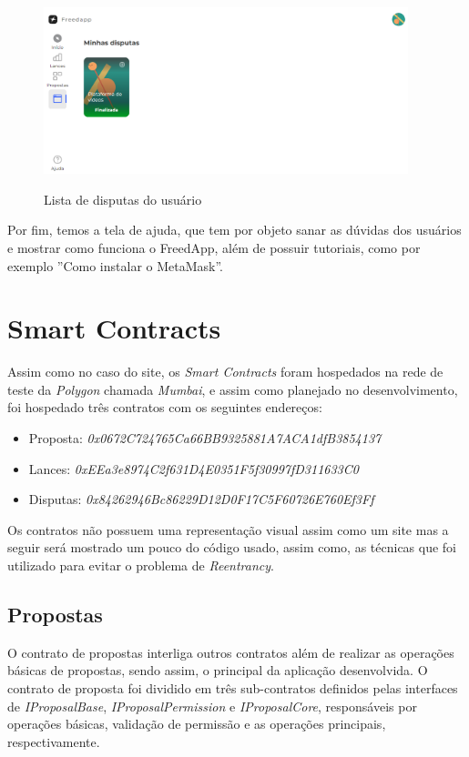 \begin{figure}[!h]
  \centering
  \caption{Lista de disputas do usuário}
  \includegraphics[width=400px]{src/images/app/dispute_finish.PNG}
  \label{fig:dispute_finish_fig}
\end{figure}

Por fim, temos a tela de ajuda, que tem por objeto sanar as dúvidas dos usuários e mostrar como funciona o FreedApp, além de possuir tutoriais, como por exemplo ''Como instalar o MetaMask''.

\section{Smart Contracts}

Assim como no caso do site, os \textit{Smart Contracts} foram hospedados na rede de teste da \textit{Polygon} chamada \textit{Mumbai}, e assim como planejado no desenvolvimento, foi hospedado três contratos com os seguintes endereços:

\begin{itemize}
    \item Proposta: \textit{0x0672C724765Ca66BB9325881A7ACA1dfB3854137}
    \item Lances: \textit{0xEEa3e8974C2f631D4E0351F5f30997fD311633C0}
    \item Disputas: \textit{0x84262946Bc86229D12D0F17C5F60726E760Ef3Ff}
\end{itemize}

Os contratos não possuem uma representação visual assim como um site mas a seguir será mostrado um pouco do código usado, assim como, as técnicas que foi utilizado para evitar o problema de \textit{Reentrancy}.

\subsection{Propostas}

O contrato de propostas interliga outros contratos além de realizar as operações básicas de propostas, sendo assim, o principal da aplicação desenvolvida. O contrato de proposta foi dividido em três sub-contratos definidos pelas interfaces de \textit{IProposalBase}, \textit{IProposalPermission} e \textit{IProposalCore}, responsáveis por operações básicas, validação de permissão e as operações principais, respectivamente.

